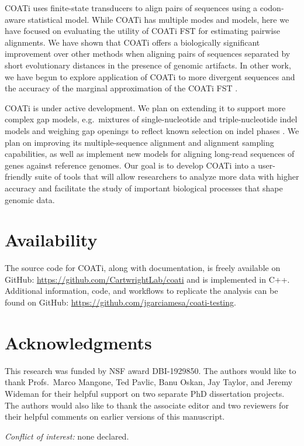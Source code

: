 \documentclass[12pt,letterpaper]{article}
\begin{document}
COATi uses finite-state transducers to align pairs of sequences using a codon-aware statistical model. While COATi has multiple modes and models, here we have focused on evaluating the utility of COATi FST for estimating pairwise alignments. We have shown that COATi offers a biologically significant improvement over other methods when aligning pairs of sequences separated by short evolutionary distances in the presence of genomic artifacts. In other work, we have begun to explore application of COATi to more divergent sequences and the accuracy of the marginal approximation of the COATi FST \citep{garcia2023dissertation}. 

COATi is under active development. We plan on extending it to support more complex gap models, e.g.\ mixtures of single-nucleotide and triple-nucleotide indel models and weighing gap openings to reflect known selection on indel phases \citep{zhu2022profiling}. We plan on improving its multiple-sequence alignment and alignment sampling capabilities, as well as implement new models for aligning long-read sequences of genes against reference genomes. Our goal is to develop COATi into a user-friendly suite of tools that will allow researchers to analyze more data with higher accuracy and facilitate the study of important biological processes that shape genomic data.

\section*{Availability}
The source code for COATi, along with documentation, is freely available on GitHub: \url{https://github.com/CartwrightLab/coati} and is implemented in C++. Additional information, code, and workflows to replicate the analysis can be found on GitHub: \url{https://github.com/jgarciamesa/coati-testing}.


\section*{Acknowledgments}

This research was funded by NSF award DBI-1929850.
%
The authors would like to thank Profs.\ Marco Mangone, Ted Pavlic, Banu Oskan, Jay Taylor, and Jeremy Wideman for their helpful support on two separate PhD dissertation projects. The authors would also like to thank the associate editor and two reviewers for their helpful comments on earlier versions of this manuscript.

\noindent \textit{Conflict of interest:} none declared.

%
\setlength{\bibhang}{0pt}


\nolinenumbers
\end{document}
